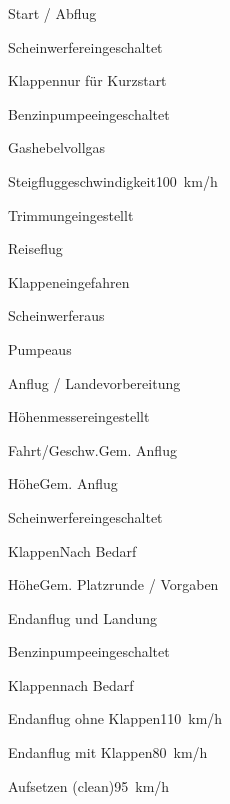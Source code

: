 \begin{checklist}{Start / Abflug}
	  \item{Scheinwerfer}{eingeschaltet}
	  \item{Klappen}{nur für Kurzstart}
	  \item{Benzinpumpe}{eingeschaltet}
	  \item{Gashebel}{vollgas}
	\item{Steigfluggeschwindigkeit}{100~km/h}
	\item{Trimmung}{eingestellt}
\end{checklist}
	
\begin{checklist}{Reiseflug}
	\item{Klappen}{eingefahren}
	\item{Scheinwerfer}{aus}
	\item{Pumpe}{aus}
\end{checklist}

\begin{checklist}{Anflug / Landevorbereitung}
	\item{Höhenmesser}{eingestellt}
	\item{Fahrt/Geschw.}{Gem. Anflug}
	\item{Höhe}{Gem. Anflug}
	\item{Scheinwerfer}{eingeschaltet}
	\item{Klappen}{Nach Bedarf}
	\item{Höhe}{Gem. Platzrunde / Vorgaben}
\end{checklist}

\begin{checklist}{Endanflug und Landung}
	\item{Benzinpumpe}{eingeschaltet}
	\item{Klappen}{nach Bedarf}
	\item{Endanflug ohne Klappen}{110~km/h}
	\item{Endanflug mit Klappen}{80~km/h}
	\item{Aufsetzen (clean)}{95~km/h}
\end{checklist}


